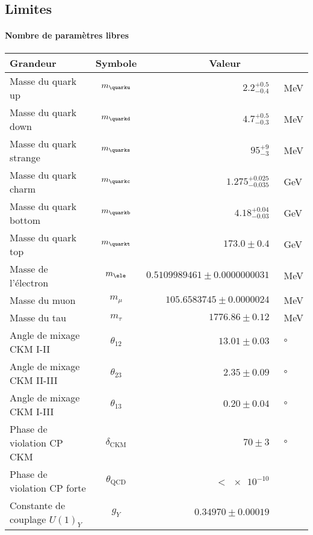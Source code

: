 \subsection{Limites}\label{chapter-MS-MSSM-section-succes_limites-subsec-limites}
\paragraph{Nombre de paramètres libres}
\begin{table}[h]
\centering
\begin{tabular}{lcrl}
\toprule
Grandeur & Symbole & \multicolumn{2}{c}{Valeur} \\
\midrule
Masse du quark up & $m_{\quarku}$ & $\num{2.2}^{+\num{0.5}}_{-\num{0.4}}$ & \SI{}{\MeV} \\
Masse du quark down & $m_{\quarkd}$ & $\num{4.7}^{+\num{0.5}}_{-\num{0.3}}$ & \SI{}{\MeV} \\
Masse du quark strange & $m_{\quarks}$ & $\num{95}^{+\num{9}}_{-\num{3}}$ & \SI{}{\MeV} \\
Masse du quark charm & $m_{\quarkc}$ & $\num{1.275}^{+\num{0.025}}_{-\num{0.035}}$ & \SI{}{\GeV} \\
Masse du quark bottom & $m_{\quarkb}$ & $\num{4.18}^{+\num{0.04}}_{-\num{0.03}}$ & \SI{}{\GeV} \\
Masse du quark top & $m_{\quarkt}$ & $\num{173.0}\pm\num{0.4}$ & \SI{}{\GeV} \\
Masse de l'électron & $m_{\ele}$ & $\num{0.5109989461}\pm\num{0.0000000031}$ & \SI{}{\MeV} \\
Masse du muon & $m_{\mu}$ & $\num{105.6583745}\pm\num{0.0000024}$ & \SI{}{\MeV} \\
Masse du tau & $m_{\tau}$ & $\num{1776.86}\pm\num{0.12}$ & \SI{}{\MeV} \\
Angle de mixage CKM I-II & $\theta_{12}$ & $\num{13.01}\pm\num{0.03}$ & \SI{}{\degree} \\
Angle de mixage CKM II-III & $\theta_{23}$ & $\num{2.35}\pm\num{0.09}$ & \SI{}{\degree} \\
Angle de mixage CKM I-III & $\theta_{13}$ & $\num{0.20}\pm\num{0.04}$ & \SI{}{\degree} \\
Phase de violation CP CKM & $\delta_{\text{CKM}}$ & $\num{70}\pm\num{3}$ & \SI{}{\degree} \\
Phase de violation CP forte & $\theta_{\text{QCD}}$ & $<\num{e-10}$ & \\
Constante de couplage $U(1)_Y$ & $g_Y$ & $\num{0.34970}\pm\num{0.00019}$ & \\

\end{tabular}
\end{table}
